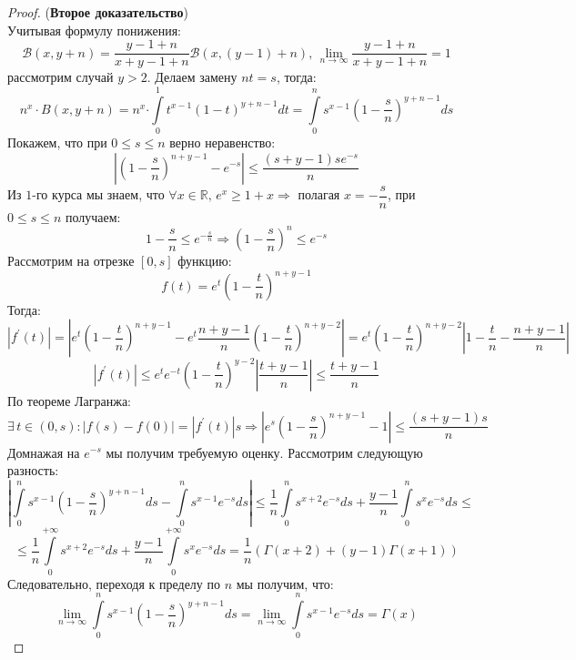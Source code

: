 \documentclass[12pt]{article}
\newcommand{\MR}{\mathbb{R}}
\newcommand{\MB}{\mathcal{B}}
\theoremstyle{definition}
\newcommand{\ddint}[2]{\displaystyle\int\limits_{#1}^{#2}}
\begin{document}
\begin{proof}(\textbf{Второе доказательство})\hfill\\
	
	Учитывая формулу понижения:
	$$
		\MB(x,y + n) =  \dfrac{y -1 + n}{x + y -1 + n}\MB(x, (y-1) + n), \, \lim\limits_{n \to \infty}\dfrac{y -1 + n}{x + y -1 + n} = 1 
	$$
	рассмотрим случай $y > 2$. Делаем замену $nt = s$, тогда:
	$$
		n^x{\cdot}B(x,y+n) =  n^x{\cdot\!}\ddint{0}{1}t^{x-1}(1-t)^{y+n - 1}dt = \ddint{0}{n}s^{x-1}\left(1 - \dfrac{s}{n}\right)^{y + n - 1}ds
	$$
	Покажем, что при $0 \leq s \leq n$ верно неравенство:
	$$
		\left|\left(1 - \dfrac{s}{n}\right)^{n + y - 1} -e^{-s}\right| \leq \dfrac{(s + y - 1)se^{-s}}{n}
	$$
	Из $1$-го курса мы знаем, что $\forall x \in \MR, \, e^x \geq 1 + x \Rightarrow$ полагая $x = -\dfrac{s}{n}$, при $0 \leq s \leq n$ получаем:
	$$
		1 - \dfrac{s}{n} \leq e^{-\tfrac{s}{n}} \Rightarrow 	\left(1 - \dfrac{s}{n}\right)^n \leq e^{-s}
	$$
	Рассмотрим на отрезке $[0,s]$ функцию:
	$$
		f(t) = e^t \left(1 - \dfrac{t}{n}\right)^{n + y - 1}
	$$
	Тогда:
	$$
		|f^\prime(t)| = \left| e^t\left(1 - \dfrac{t}{n}\right)^{n + y-1} - e^t\dfrac{n + y - 1}{n}\left(1 - \dfrac{t}{n}\right)^{n + y - 2} \right| = e^t\left(1 - \dfrac{t}{n}\right)^{n+y - 2}\left|1 - \dfrac{t}{n} - \dfrac{n + y - 1}{n}\right|
	$$
	$$
		|f^\prime(t)| \leq e^te^{-t}\left(1 - \dfrac{t}{n}\right)^{y - 2}\left|\dfrac{t + y - 1}{n}\right| \leq \dfrac{t + y - 1}{n}
	$$
	По теореме Лагранжа:
	$$
		\exists \, t \in (0,s) \colon |f(s) - f(0)| = |f^\prime(t)|s \Rightarrow \left|e^s\left(1 - \dfrac{s}{n}\right)^{n + y - 1} -1\right|  \leq \dfrac{(s + y - 1)s}{n}
	$$
	Домнажая на $e^{-s}$ мы получим требуемую оценку. Рассмотрим следующую разность:
	$$
		\left|\ddint{0}{n}s^{x-1}\left(1 - \dfrac{s}{n}\right)^{y +n -1}ds - \ddint{0}{n}s^{x-1}e^{-s}ds\right| \leq \dfrac{1}{n}\ddint{0}{n}s^{x+2}e^{-s}ds + \dfrac{y-1}{n}\ddint{0}{n}s^xe^{-s}ds \leq
	$$
	$$
		\leq \dfrac{1}{n}\ddint{0}{+\infty}s^{x+2}e^{-s}ds + \dfrac{y-1}{n}\ddint{0}{+\infty}s^xe^{-s}ds = \dfrac{1}{n}\left(\Gamma(x+2) + (y-1)\Gamma(x+1)\right)
	$$
	Следовательно, переходя к пределу по $n$ мы получим, что:
	$$
		\lim\limits_{n \to \infty}\ddint{0}{n}s^{x-1}\left(1 - \dfrac{s}{n}\right)^{y +n -1}ds = \lim\limits_{n \to \infty}\ddint{0}{n}s^{x-1}e^{-s}ds = \Gamma(x)
	$$
\end{proof}
\end{document}
